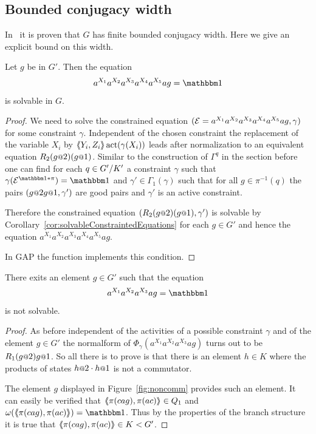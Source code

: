 \documentclass[a4paper,11pt]{amsart}
\begin{document}
\subsection{Bounded conjugacy width}
In~\cite{Fink:Conjugacy_growth} it is proven that $G$ has finite bounded conjugacy width. Here we give an explicit bound 
on this width.
\begin{pro}\label{pro:productOf6Conjugates}
 Let $g$ be in $G'$. Then the equation 
 \begin{align*}
  a^{X_1}a^{X_2}a^{X_3}a^{X_4}a^{X_5}ag=\id
 \end{align*}
is solvable in $G$. 
\end{pro}
\begin{proof}
We need to solve the constrained equation $(\mathcal{E}=a^{X_1}a^{X_2}a^{X_3}a^{X_4}a^{X_5}ag,\gamma)$ for
some constraint $\gamma$. Independent of the chosen constraint the replacement of
the variable $X_i$ by $\langle\negthickspace\langle Y_i,Z_i\rangle\negthickspace\rangle\operatorname{act}(\gamma(X_i))$ leads after normalization to an equivalent equation 
$R_2(g\at{2})(g\at{1})$. Similar to the construction of $\Gamma^q$ in the section
before one can find for each $q\in{G'/K'}$ a constraint $\gamma$ such that
$\gamma(\eq{E}^{\id*\pi})=\id$ and $\gamma'\in\Gamma_1(\gamma)$ such that for all 
$g\in\pi^{-1}(q)$ the pairs $(g\at{2}g\at{1},\gamma')$ are good pairs and $\gamma'$ is 
an active constraint.

Therefore the constrained equation $(R_2(g\at{2})(g\at{1}),\gamma')$ is solvable
by Corollary~\ref{cor:solvableConstraintedEquations}
for each $g\in G'$ and hence the equation $a^{X_1}a^{X_2}a^{X_3}a^{X_4}a^{X_5}ag$.

In GAP the function  implements 
this condition.
\end{proof}	
\begin{lem}
 There exits an element $g\in G'$ such that the equation 
 \begin{align*}
  a^{X_1}a^{X_2}a^{X_3}ag=\id
 \end{align*}
 is not solvable.
\end{lem}
\begin{proof}
As before independent of the activities of a possible constraint $\gamma$ and of the element $g\in G'$
the normalform of $\Phi_\gamma(a^{X_1}a^{X_2}a^{X_3}ag)$ turns out to
be $R_1(g\at{2}) g\at{1}$. So all there is to prove is that there is an element $h\in K$
where the products of states $h\at{2}\cdot h\at{1}$ is not a commutator.

The element $g$ displayed in Figure~\ref{fig:noncomm} provides such an element. It can easily be verified 
that $\langle\negthickspace\langle\pi(cag),\pi(ac)\rangle\negthickspace\rangle\in Q_1$ and $\omega(\pair{\pi(cag),\pi(ac)})=\id$. Thus by
the properties of the branch structure it is true that $\langle\negthickspace\langle\pi(cag),\pi(ac)\rangle\negthickspace\rangle\in K<G'$. 
\end{proof}
\end{document}
